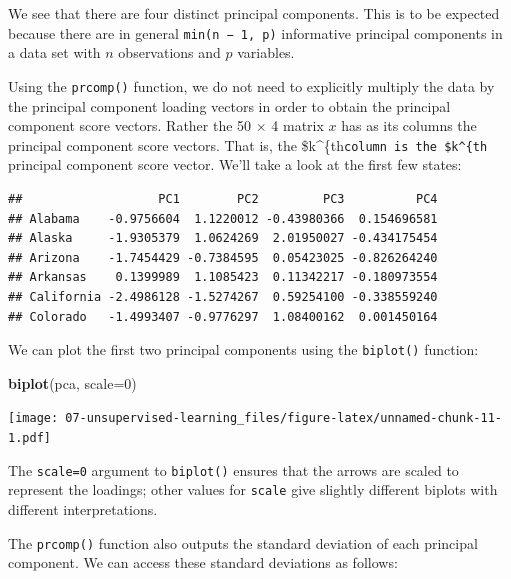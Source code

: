 \documentclass[
  openany]{book}
\newenvironment{Shaded}{\begin{snugshade}}{\end{snugshade}}
\newcommand{\DataTypeTok}[1]{\textcolor[rgb]{0.13,0.29,0.53}{#1}}
\newcommand{\DecValTok}[1]{\textcolor[rgb]{0.00,0.00,0.81}{#1}}
\newcommand{\KeywordTok}[1]{\textcolor[rgb]{0.13,0.29,0.53}{\textbf{#1}}}
\newcommand{\NormalTok}[1]{#1}
\newcommand{\OperatorTok}[1]{\textcolor[rgb]{0.81,0.36,0.00}{\textbf{#1}}}
\begin{document}
We see that there are four distinct principal components. This is to be
expected because there are in general \texttt{min(n\ −\ 1,\ p)} informative principal
components in a data set with \(n\) observations and \(p\) variables.

Using the \texttt{prcomp()} function, we do not need to explicitly multiply the
data by the principal component loading vectors in order to obtain the
principal component score vectors. Rather the 50 × 4 matrix \(x\) has as its
columns the principal component score vectors. That is, the \$k\^{}\{th\texttt{column\ is\ the\ \$k\^{}\{th} principal component score vector. We'll take a look at the first few states:

\begin{Shaded}
\end{Shaded}

\begin{verbatim}
##                   PC1        PC2         PC3          PC4
## Alabama    -0.9756604  1.1220012 -0.43980366  0.154696581
## Alaska     -1.9305379  1.0624269  2.01950027 -0.434175454
## Arizona    -1.7454429 -0.7384595  0.05423025 -0.826264240
## Arkansas    0.1399989  1.1085423  0.11342217 -0.180973554
## California -2.4986128 -1.5274267  0.59254100 -0.338559240
## Colorado   -1.4993407 -0.9776297  1.08400162  0.001450164
\end{verbatim}

We can plot the first two principal components using the \texttt{biplot()} function:

\begin{Shaded}
\begin{Highlighting}[]
\KeywordTok{biplot}\NormalTok{(pca, }\DataTypeTok{scale=}\DecValTok{0}\NormalTok{)}
\end{Highlighting}
\end{Shaded}

\texttt{[image: 07-unsupervised-learning\_files/figure-latex/unnamed-chunk-11-1.pdf]}

The \texttt{scale=0} argument to \texttt{biplot()} ensures that the arrows are scaled to
represent the loadings; other values for \texttt{scale} give slightly different biplots
with different interpretations.

The \texttt{prcomp()} function also outputs the standard deviation of each principal
component. We can access these standard deviations as follows:
\end{document}
